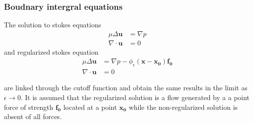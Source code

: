 \subsubsection{Boudnary intergral equations}

The solution to stokes equations
\begin{equation}
    \label{eq:BIE1}
\begin{aligned}
      \mu\Delta\boldsymbol{u} &= \nabla p \\
      \nabla \cdot \boldsymbol{u} &= 0
\end{aligned}
\end{equation}
and regularized stokes equation
\begin{equation}
    \label{eq:BIE2}
\begin{aligned}
      \mu\Delta\boldsymbol{u} &= \nabla p - \phi_{\epsilon}(\mathbf{x}-\mathbf{x_0})\mathbf{f_0} \\
      \nabla \cdot \boldsymbol{u} &= 0
\end{aligned}
\end{equation}

are linked through the cutoff function and obtain the same results in the limit as $\epsilon \to 0$. It is assumed that the regularized solution is a flow generated by a a point force of strength $\mathbf{f_0}$ located at a point $\mathbf{x_0}$ while the non-regularized solution is absent of all forces.

